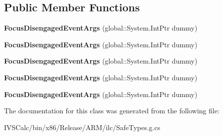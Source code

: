 \subsection*{Public Member Functions}
\begin{DoxyCompactItemize}
\item 
\mbox{\label{class_windows_1_1_u_i_1_1_xaml_1_1_controls_1_1_focus_disengaged_event_args_aa73475506df9b22ac7e6aaf4c18aed7b}} 
{\bfseries Focus\+Disengaged\+Event\+Args} (global\+::\+System.\+Int\+Ptr dummy)
\item 
\mbox{\label{class_windows_1_1_u_i_1_1_xaml_1_1_controls_1_1_focus_disengaged_event_args_aa73475506df9b22ac7e6aaf4c18aed7b}} 
{\bfseries Focus\+Disengaged\+Event\+Args} (global\+::\+System.\+Int\+Ptr dummy)
\item 
\mbox{\label{class_windows_1_1_u_i_1_1_xaml_1_1_controls_1_1_focus_disengaged_event_args_aa73475506df9b22ac7e6aaf4c18aed7b}} 
{\bfseries Focus\+Disengaged\+Event\+Args} (global\+::\+System.\+Int\+Ptr dummy)
\item 
\mbox{\label{class_windows_1_1_u_i_1_1_xaml_1_1_controls_1_1_focus_disengaged_event_args_aa73475506df9b22ac7e6aaf4c18aed7b}} 
{\bfseries Focus\+Disengaged\+Event\+Args} (global\+::\+System.\+Int\+Ptr dummy)
\item 
\mbox{\label{class_windows_1_1_u_i_1_1_xaml_1_1_controls_1_1_focus_disengaged_event_args_aa73475506df9b22ac7e6aaf4c18aed7b}} 
{\bfseries Focus\+Disengaged\+Event\+Args} (global\+::\+System.\+Int\+Ptr dummy)
\end{DoxyCompactItemize}


The documentation for this class was generated from the following file\+:\begin{DoxyCompactItemize}
\item 
I\+V\+S\+Calc/bin/x86/\+Release/\+A\+R\+M/ilc/Safe\+Types.\+g.\+cs\end{DoxyCompactItemize}
